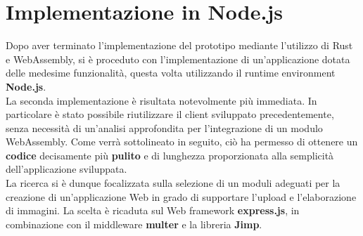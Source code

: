 \newpage
\section{Implementazione in Node.js}
Dopo aver terminato l'implementazione del prototipo mediante l'utilizzo di Rust e WebAssembly, si è proceduto con l'implementazione di un'applicazione dotata delle medesime funzionalità, questa volta utilizzando il runtime environment \textbf{Node.js}.
\\La seconda implementazione è risultata notevolmente più immediata.
In particolare è stato possibile riutilizzare il client sviluppato precedentemente, senza necessità di un'analisi approfondita per l'integrazione di un modulo WebAssembly.
Come verrà sottolineato in seguito, ciò ha permesso di ottenere un \textbf{codice} decisamente più \textbf{pulito} e di lunghezza proporzionata alla semplicità dell'applicazione sviluppata.
\\La ricerca si è dunque focalizzata sulla selezione di un moduli adeguati per la creazione di un'applicazione Web in grado di supportare l'upload e l'elaborazione di immagini.
La scelta è ricaduta sul Web framework \textbf{express.js}, in combinazione con il middleware \textbf{multer} e la libreria \textbf{Jimp}.
